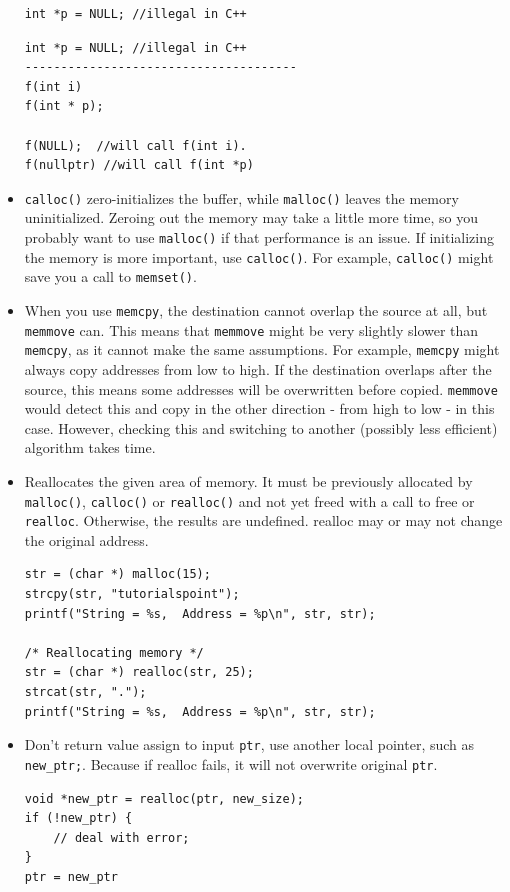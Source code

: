 \documentclass[a4paper,11pt,twoside]{book}
\begin{document}
\begin{itemize}
\begin{lstlisting}[numbers=none]
int *p = NULL; //illegal in C++
\end{lstlisting}

	
\begin{lstlisting}[numbers=none]
int *p = NULL; //illegal in C++
--------------------------------------
f(int i)
f(int * p);

f(NULL);  //will call f(int i).
f(nullptr) //will call f(int *p)
\end{lstlisting}
	
	\item \texttt{calloc()} zero-initializes the buffer, while \texttt{malloc()} leaves the memory uninitialized. Zeroing out the memory may take a little more time, so you probably want to use \texttt{malloc()} if that performance is an issue. If initializing the memory is more important, use \texttt{calloc()}. For example, \texttt{calloc()} might save you a call to \texttt{memset()}.
	
	\item When you use \texttt{memcpy}, the destination cannot overlap the source at all, but \texttt{memmove} can. This means that \texttt{memmove} might be very slightly slower than \texttt{memcpy}, as it cannot make the same assumptions. For example, \texttt{memcpy} might always copy addresses from low to high. If the destination overlaps after the source, this means some addresses will be overwritten before copied. \texttt{memmove} would detect this and copy in the other direction - from high to low - in this case. However, checking this and switching to another (possibly less efficient) algorithm takes time.
	
	\item Reallocates the given area of memory. It must be previously allocated by \texttt{malloc()}, \texttt{calloc()} or \texttt{realloc()} and not yet freed with a call to free or \texttt{realloc}. Otherwise, the results are undefined. realloc may or may not change the original address. 

\begin{lstlisting}[]
str = (char *) malloc(15);
strcpy(str, "tutorialspoint");
printf("String = %s,  Address = %p\n", str, str);

/* Reallocating memory */
str = (char *) realloc(str, 25);
strcat(str, ".");
printf("String = %s,  Address = %p\n", str, str);
\end{lstlisting}
	
	
	\item Don't return value assign to input \texttt{ptr}, use another local pointer, such as \texttt{new\_ptr;}. Because if realloc fails, it will not overwrite original \texttt{ptr}.
\begin{lstlisting}[numbers=none]
void *new_ptr = realloc(ptr, new_size);
if (!new_ptr) {
	// deal with error;
}
ptr = new_ptr
\end{lstlisting}
\end{itemize}
\end{document}
